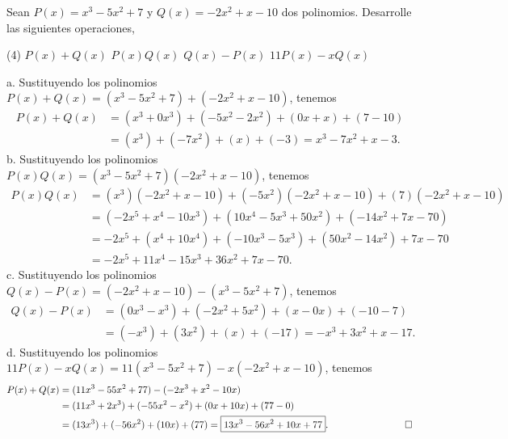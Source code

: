 \begin{example}
    Sean $P(x) = x^3 - 5x^2 + 7$ y $Q(x) = -2x^2 + x - 10$ dos polinomios.
    Desarrolle las siguientes operaciones,
    \begin{tasks}[label=\alph*.](4)
        \task $P(x) + Q(x)$
        \task $P(x) Q(x)$
        \task $Q(x) - P(x)$
        \task $11 P(x) - x Q(x)$
    \end{tasks}
\end{example}
\begin{solution}
    a. Sustituyendo los polinomios $P(x) + Q(x) = (x^3 - 5x^2 + 7) + (-2x^2 + x - 10)$, tenemos
    \begin{align*}
        P(x) + Q(x) &= (x^3 + 0x^3) + (-5 x^2 - 2x^2) + (0x + x) + (7 - 10)\\
        &= (x^3) + (-7x^2) + (x) + (-3) = \boxed{x^3 - 7x^2 + x - 3}.
    \end{align*}
    b. Sustituyendo los polinomios $P(x) Q(x) = (x^3 - 5x^2 + 7)(-2x^2 + x - 10)$, tenemos
    \begin{align*}
        P(x) Q(x) &= (x^3)(-2x^2 + x - 10) + (-5x^2)(-2x^2 + x - 10) + (7)(-2x^2 + x - 10)\\
        &= (-2x^5 + x^4 - 10x^3) + (10x^4 - 5x^3 + 50x^2) + (-14x^2 + 7x - 70)\\
        &= -2x^5 + (x^4 + 10x^4) + ( - 10x^3 - 5x^3) + (50x^2 -14x^2) + 7x - 70\\
        &= \boxed{-2x^5 + 11x^4 - 15x^3 + 36x^2 + 7x - 70}.
    \end{align*}
    c. Sustituyendo los polinomios $Q(x) - P(x) = (-2x^2 + x - 10) - (x^3 - 5x^2 + 7)$, tenemos
    \begin{align*}
        Q(x) - P(x) &= (0x^3 - x^3) + (- 2x^2 + 5 x^2) + (x - 0x) + (- 10 - 7)\\
        &= (-x^3) + (3x^2) + (x) + (-17) = \boxed{-x^3 + 3x^2 + x - 17}.
    \end{align*}
    d. Sustituyendo los polinomios $11P(x) - xQ(x) = 11(x^3 - 5x^2 + 7) - x(-2x^2 + x - 10)$, tenemos
    \begin{align*}
        P(x) + Q(x) &= (11x^3 - 55x^2 + 77) - (-2x^3 + x^2 - 10x)\\
        &= (11x^3 + 2x^3) + (-55 x^2 - x^2) + (0x + 10x) + (77 - 0)\\
        &= (13x^3) + (-56x^2) + (10x) + (77) = \boxed{13x^3 - 56x^2 + 10x + 77}.\qquad\qquad\qquad\qedhere
    \end{align*}
\end{solution}


